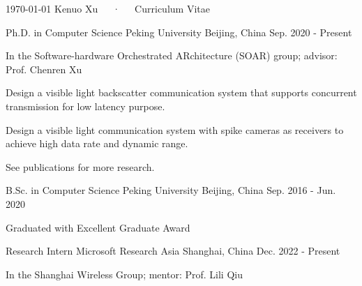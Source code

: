 \documentclass[11pt, a4paper]{awesome-cv}
\begin{document}
\makecvheader

\makecvfooter
  {\today}
  {Kenuo Xu~~~·~~~Curriculum Vitae}
  {\thepage}



\begin{cventries}
	
	\cventry
	{Ph.D. in Computer Science}
	{Peking University}
	{Beijing, China}
	{Sep. 2020 - Present}
	{
		\begin{cvitems} %
			\item {In the Software-hardware Orchestrated ARchitecture (SOAR) group; advisor: Prof. Chenren Xu}
			\item {Design a visible light backscatter communication system that supports concurrent transmission for low latency purpose.}
			\item {Design a visible light communication system with spike cameras as receivers to achieve high data rate and dynamic range.}
			\item {See publications for more research.}
		\end{cvitems}
	}

	\cventry
	{B.Sc. in Computer Science} %
	{Peking University} %
	{Beijing, China} %
	{Sep. 2016 - Jun. 2020} %
	{
		\begin{cvitems} %
			\item {Graduated with Excellent Graduate Award}
		\end{cvitems}
	}

\end{cventries}

\begin{cventries}
	
	\cventry
	{Research Intern} %
	{Microsoft Research Asia} %
	{Shanghai, China} %
	{Dec. 2022 - Present} %
	{
		\begin{cvitems} %
			\item {In the Shanghai Wireless Group; mentor: Prof. Lili Qiu}
		\end{cvitems}
	}
	
\end{cventries}
\end{document}

